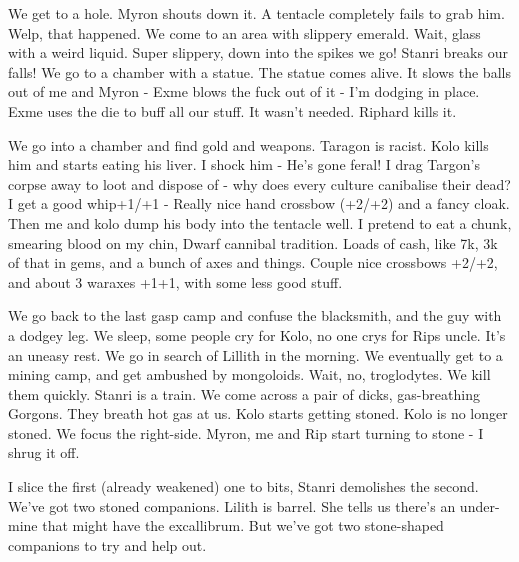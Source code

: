 \begin{multicols}{2}
We get to a hole. Myron shouts down it. A tentacle completely fails to grab him. Welp, that happened. We come to an area with slippery emerald. Wait, glass with a weird liquid. Super slippery, down into the spikes we go! Stanri breaks our falls! We go to a chamber with a statue. The statue comes alive. It slows the balls out of me and Myron - Exme blows the fuck out of it - I’m dodging in place. Exme uses the die to buff all our stuff. It wasn’t needed. Riphard kills it.\medskip

We go into a chamber and find gold and weapons. Taragon is racist. Kolo kills him and starts eating his liver. I shock him - He’s gone feral! I drag Targon’s corpse away to loot and dispose of - why does every culture canibalise their dead? I get a good whip+1/+1 - Really nice hand crossbow (+2/+2) and a fancy cloak. Then me and kolo dump his body into the tentacle well. I pretend to eat a chunk, smearing blood on my chin, Dwarf cannibal tradition. Loads of cash, like 7k, 3k of that in gems, and a bunch of axes and things. Couple nice crossbows +2/+2, and about 3 waraxes +1+1, with some less good stuff.\medskip

We go back to the last gasp camp and confuse the blacksmith, and the guy with a dodgey leg. We sleep, some people cry for Kolo, no one crys for Rips uncle. It’s an uneasy rest. We go in search of Lillith in the morning. We eventually get to a mining camp, and get ambushed by mongoloids. Wait, no, troglodytes. We kill them quickly. Stanri is a train. We come across a pair of dicks, gas-breathing Gorgons. They breath hot gas at us. Kolo starts getting stoned. Kolo is no longer stoned. We focus the right-side. Myron, me and Rip start turning to stone - I shrug it off.\medskip

I slice the first (already weakened) one to bits, Stanri demolishes the second. We’ve got two stoned companions. Lilith is barrel. She tells us there’s an under-mine that might have the excallibrum. But we’ve got two stone-shaped companions to try and help out.\medskip

\end{multicols}

\vspace*{5mm}

